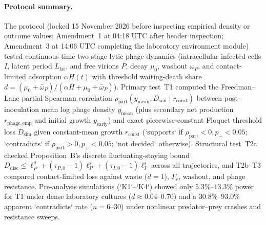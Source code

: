 \paragraph{Protocol summary.}
The protocol (locked 15 November 2026 before inspecting empirical density or outcome values; Amendment~1 at 04:18 UTC after header inspection; Amendment~3 at 14:06 UTC completing the laboratory environment module) tested continuous-time two-stage lytic phage dynamics (intracellular infected cells $I$, latent period $L_{\mathrm{lat}}$, and free virions $P$, decay $\mu_0$, washout $\omega_P$, and contact-limited adsorption $\alpha H(t)$ with threshold waiting-death share $d = (\mu_0 + \bar{\omega}_P)/(\alpha\bar{H} + \mu_0 + \bar{\omega}_P)$). Primary test~T1 computed the Freedman--Lane partial Spearman correlation $\rho_{\mathrm{part}}(y_{\mathrm{mean}}, D_{\mathrm{sim}} \mid r_{\mathrm{const}})$ between post-inoculation mean log phage density $y_{\mathrm{mean}}$ (plus secondary net production $r_{\mathrm{phage,emp}}$ and initial growth $y_{\mathrm{early}}$) and exact piecewise-constant Floquet threshold loss $D_{\mathrm{sim}}$ given constant-mean growth $r_{\mathrm{const}}$ (`supports` if $\rho_{\mathrm{part}} < 0, p_- < 0.05$; `contradicts` if $\rho_{\mathrm{part}} > 0, p_+ < 0.05$; `not decided` otherwise). Structural test~T2a checked Proposition~B's discrete fluctuating-staying bound $D_{\mathrm{disc}} \le \ell_P^g + (\tau_{P,0} - 1)\ell_P^s + (\tau_{I,0} - 1)\ell_I^s$ across all trajectories, and T2b--T3 compared contact-limited loss against waste ($d = 1$), $\Gamma_c$, washout, and phage resistance. Pre-analysis simulations (`K1`--`K4`) showed only $5.3\%$--$13.3\%$ power for T1 under dense laboratory cultures ($d \approx 0.04$--$0.70$) and a $30.8\%$--$93.0\%$ apparent `contradicts` rate ($n = 6$--$30$) under nonlinear predator--prey crashes and resistance sweeps.

